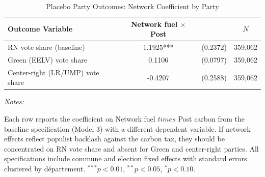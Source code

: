 \begin{table}[!h]
\centering
\caption{Placebo Party Outcomes: Network Coefficient by Party}
\centering
\fontsize{10}{12}\selectfont
\begin{threeparttable}
\begin{tabular}[t]{lccc}
\toprule
Outcome Variable & Network fuel $\times$ Post &  & $N$\\
\midrule
RN vote share (baseline) & 1.1925*** & (0.2372) & 359,062\\
Green (EELV) vote share & 0.1106 & (0.0797) & 359,062\\
Center-right (LR/UMP) vote share & -0.4207 & (0.2588) & 359,062\\
\bottomrule
\end{tabular}
\begin{tablenotes}
\item \textit{Notes:} 
\item Each row reports the coefficient on Network fuel $times$ Post carbon from the baseline specification (Model 3) with a different dependent variable. If network effects reflect populist backlash against the carbon tax, they should be concentrated on RN vote share and absent for Green and center-right parties. All specifications include commune and election fixed effects with standard errors clustered by d\'{e}partement. $^{***}p<0.01$, $^{**}p<0.05$, $^{*}p<0.10$.
\end{tablenotes}
\end{threeparttable}
\end{table}
